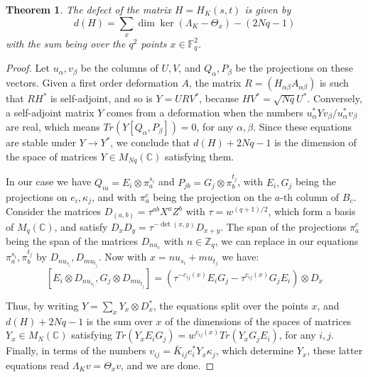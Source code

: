 \documentclass[11pt]{amsart}
\newtheorem{theorem}{Theorem}[section]
\theoremstyle{definition}
\begin{document}
\begin{theorem}\label{tdef}
The defect of the matrix $H=H_K(s,t)$ is given by
$$d(H)=\sum_x\dim\ker(\Lambda_K-\Theta_x)-(2Nq-1)$$
with the sum being over the $q^2$ points $x\in\mathbb F_q^2$.
\end{theorem}

\begin{proof}
Let $u_\alpha,v_\beta$ be the columns of $U,V$, and $Q_\alpha,P_\beta$ be the projections on these vectors. Given a first order deformation $A$, the matrix $R=(H_{\alpha\beta}A_{\alpha\beta})$ is such that $RH^*$ is self-adjoint, and so is $Y=URV^*$, because $HV^*=\sqrt{Nq}U^*$. Conversely, a self-adjoint matrix $Y$ comes from a deformation when the numbers $u_\alpha^*Yv_\beta/u_\alpha^*v_\beta$ are real, which means $Tr(Y[Q_\alpha,P_\beta])=0$, for any $\alpha,\beta$. Since these equations are stable under $Y\to Y^*$, we conclude that $d(H)+2Nq-1$ is the dimension of the space of matrices $Y\in M_{Nq}(\mathbb C)$ satisfying them.

\medskip

In our case we have $Q_{ia}=E_i\otimes\pi^{s_i}_a$ and $P_{jb}=G_j\otimes\pi^{t_j}_b$, with $E_i,G_j$ being the projections on $e_i,\kappa_j$, and with $\pi^c_a$ being the projection on the $a$-th column of $B_c$. Consider the matrices $D_{(a,b)}=\tau^{ab}X^aZ^b$ with $\tau=w^{(q+1)/2}$, which form a basis of $M_q(\mathbb C)$, and satisfy $D_xD_y=\tau^{-\det(x,y)}D_{x+y}$. The span of the projections $\pi^c_a$ being the span of the matrices $D_{nu_c}$ with $n\in\mathbb Z_q$, we can replace in our equations $\pi^{s_i}_a,\pi^{t_j}_b$ by $D_{nu_{s_i}},D_{mu_{t_j}}$. Now with $x=nu_{s_i}+mu_{t_j}$ we have:
$$[E_i\otimes D_{nu_{s_i}},G_j\otimes D_{mu_{t_j}}]=(\tau^{-c_{ij}(x)}E_iG_j-\tau^{c_{ij}(x)}G_jE_i)\otimes D_x$$

Thus, by writing $Y=\sum_xY_x\otimes D_x^*$, the equations split over the points $x$, and $d(H)+2Nq-1$ is the sum over $x$ of the dimensions of the spaces of matrices $Y_x\in M_N(\mathbb C)$ satisfying $Tr(Y_xE_iG_j)=w^{c_{ij}(x)}Tr(Y_xG_jE_i)$, for any $i,j$. Finally, in terms of the numbers $v_{ij}=\bar{K}_{ij}e_i^*Y_x\kappa_j$, which determine $Y_x$, these latter equations read $\Lambda_Kv=\Theta_xv$, and we are done.
\end{proof}
\end{document}
